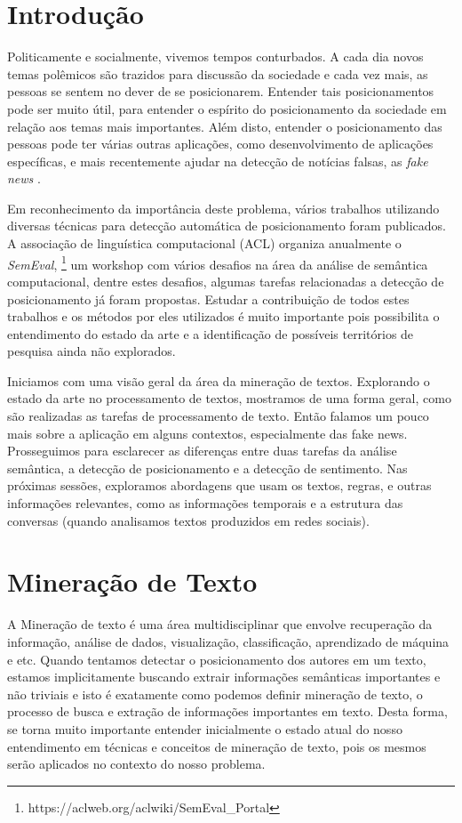 \section{Introdução}
\quad Politicamente e socialmente, vivemos tempos conturbados. A cada dia
novos temas polêmicos são trazidos para discussão da sociedade e cada
vez mais, as pessoas se sentem no dever de se posicionarem. Entender
tais posicionamentos pode ser muito útil, para entender o espírito do
posicionamento da sociedade em relação aos temas mais importantes.
\quad Além disto, entender o posicionamento das pessoas pode ter
várias outras aplicações, como desenvolvimento de aplicações específicas,
e mais recentemente ajudar na detecção de notícias falsas, as 
\emph{fake news} \cite{mrowcastance}.

\quad Em reconhecimento da importância deste problema, vários trabalhos
utilizando diversas técnicas para detecção automática de posicionamento
foram publicados. A associação de linguística computacional (ACL)
organiza anualmente o \emph{SemEval},
\footnote{https://aclweb.org/aclwiki/SemEval\_Portal} um workshop com vários
desafios na área da análise de semântica computacional, dentre estes
desafios, algumas tarefas relacionadas a detecção de posicionamento já
foram propostas. Estudar a contribuição de todos estes trabalhos e os
métodos por eles utilizados é muito importante pois possibilita o
entendimento do estado da arte e a identificação de possíveis
territórios de pesquisa ainda não explorados.

\quad Iniciamos com uma visão geral da área da mineração de textos. Explorando
o estado da arte no processamento de textos, mostramos de uma forma geral,
como são realizadas as tarefas de processamento de texto. Então falamos um
pouco mais sobre a aplicação em alguns contextos, especialmente das fake news.
Prosseguimos para esclarecer as diferenças entre duas tarefas da análise 
semântica, a detecção de posicionamento e a detecção de sentimento. Nas
próximas sessões, exploramos abordagens que usam os textos, regras, e outras
informações relevantes, como as informações temporais e a estrutura das
conversas (quando analisamos textos produzidos em redes sociais).

\section{Mineração de Texto}

\quad A Mineração de texto é uma área multidisciplinar que envolve recuperação da
informação, análise de dados, visualização, classificação, aprendizado de máquina
e etc. Quando tentamos detectar o posicionamento dos autores em um texto, estamos
implicitamente buscando extrair informações semânticas importantes e não triviais
e isto é exatamente como podemos definir mineração de texto, o processo de busca
e extração de informações importantes em texto. Desta forma, se torna muito
importante entender inicialmente o estado atual do nosso entendimento em técnicas
e conceitos de mineração de texto, pois os mesmos serão aplicados no contexto do
nosso problema.

